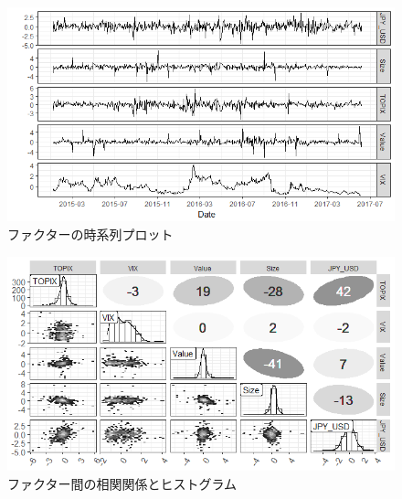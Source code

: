 ﻿\documentclass[a4paper]{jarticle}
\begin{document}
\begin{figure}[H]
	\begin{center}
		\includegraphics[width=15cm]{./fig/factor_plot.png}
		\caption{ファクターの時系列プロット}
		\label{fig:factor_plot}
	\end{center}
\end{figure}

\begin{figure}[H]
	\begin{center}
		\includegraphics[width=15cm]{./fig/factor_cor.png}
		\caption{ファクター間の相関関係とヒストグラム}
		\label{fig:factor_cor}
	\end{center}
\end{figure}
\end{document}
